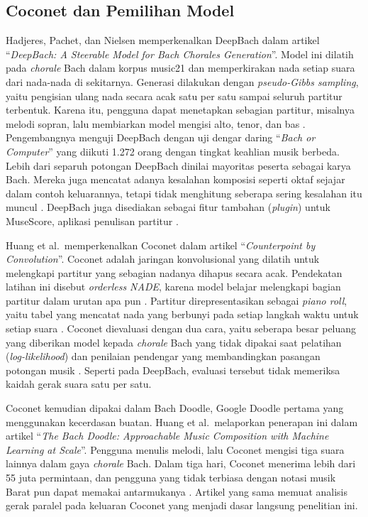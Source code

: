 \subsection{Coconet dan Pemilihan Model}\label{sec:deepbach-dan-coconet}

Hadjeres, Pachet, dan Nielsen memperkenalkan DeepBach dalam artikel ``\textit{DeepBach: A Steerable Model for Bach Chorales Generation}''. Model ini dilatih pada \textit{chorale} Bach dalam korpus music21 dan memperkirakan nada setiap suara dari nada-nada di sekitarnya. Generasi dilakukan dengan \textit{pseudo-Gibbs sampling}, yaitu pengisian ulang nada secara acak satu per satu sampai seluruh partitur terbentuk. Karena itu, pengguna dapat menetapkan sebagian partitur, misalnya melodi sopran, lalu membiarkan model mengisi alto, tenor, dan bas \parencite[1362, 1365]{hadjeres2017}. Pengembangnya menguji DeepBach dengan uji dengar daring ``\textit{Bach or Computer}'' yang diikuti 1.272 orang dengan tingkat keahlian musik berbeda. Lebih dari separuh potongan DeepBach dinilai mayoritas peserta sebagai karya Bach. Mereka juga mencatat adanya kesalahan komposisi seperti oktaf sejajar dalam contoh keluarannya, tetapi tidak menghitung seberapa sering kesalahan itu muncul \parencite[1367--1368]{hadjeres2017}. DeepBach juga disediakan sebagai fitur tambahan (\textit{plugin}) untuk MuseScore, aplikasi penulisan partitur \parencite[1368]{hadjeres2017}.

Huang et al.\ memperkenalkan Coconet dalam artikel ``\textit{Counterpoint by Convolution}''. Coconet adalah jaringan konvolusional yang dilatih untuk melengkapi partitur yang sebagian nadanya dihapus secara acak. Pendekatan latihan ini disebut \textit{orderless NADE}, karena model belajar melengkapi bagian partitur dalam urutan apa pun \parencite[211--213]{huang2017}. Partitur direpresentasikan sebagai \textit{piano roll}, yaitu tabel yang mencatat nada yang berbunyi pada setiap langkah waktu untuk setiap suara \parencite[213]{huang2017}. Coconet dievaluasi dengan dua cara, yaitu seberapa besar peluang yang diberikan model kepada \textit{chorale} Bach yang tidak dipakai saat pelatihan (\textit{log-likelihood}) dan penilaian pendengar yang membandingkan pasangan potongan musik \parencite[215--216]{huang2017}. Seperti pada DeepBach, evaluasi tersebut tidak memeriksa kaidah gerak suara satu per satu.

Coconet kemudian dipakai dalam Bach Doodle, Google Doodle pertama yang menggunakan kecerdasan buatan. Huang et al.\ melaporkan penerapan ini dalam artikel ``\textit{The Bach Doodle: Approachable Music Composition with Machine Learning at Scale}''. Pengguna menulis melodi, lalu Coconet mengisi tiga suara lainnya dalam gaya \textit{chorale} Bach. Dalam tiga hari, Coconet menerima lebih dari 55 juta permintaan, dan pengguna yang tidak terbiasa dengan notasi musik Barat pun dapat memakai antarmukanya \parencite[793]{huang2019}. Artikel yang sama memuat analisis gerak paralel pada keluaran Coconet yang menjadi dasar langsung penelitian ini.

